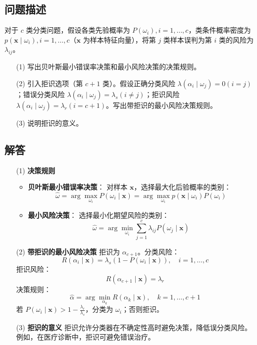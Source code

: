 \documentclass[UTF8]{report}
\theoremstyle{MyLineTheoremStyle} %
\theoremstyle{MyBlockTheoremStyle} %
\theoremstyle{MySubsubsectionStyle} %
\begin{document}
\subsection{问题描述}
对于 \( c \) 类分类问题，假设各类先验概率为 \( P(\omega_i), i=1,\ldots,c \)，类条件概率密度为 \( p(\mathbf{x} \mid \omega_i), i=1,\ldots,c \)（\(\mathbf{x}\) 为样本特征向量），将第 \( j \) 类样本误判为第 \( i \) 类的风险为 \( \lambda_{ij} \)。  
\begin{enumerate}
    \item[(1)] 写出贝叶斯最小错误率决策和最小风险决策的决策规则。
    \item[(2)] 引入拒识选项（第 \( c+1 \) 类）。假设正确分类风险 \( \lambda(\alpha_i \mid \omega_j) = 0 (i=j) \)；错误分类风险 \( \lambda(\alpha_i \mid \omega_j) = \lambda_s (i \neq j) \)；拒识风险 \( \lambda(\alpha_i \mid \omega_j) = \lambda_r (i = c+1) \)。写出带拒识的最小风险决策规则。
    \item[(3)] 说明拒识的意义。
\end{enumerate}

\subsection{解答}
\begin{itemize}
    \item[(1)] \textbf{决策规则}
    \begin{itemize}
        \item \textbf{贝叶斯最小错误率决策}：  
        对样本 \(\mathbf{x}\)，选择最大化后验概率的类别：  
        \[
        \hat{\omega} = \arg\max_{\omega_i} P(\omega_i \mid \mathbf{x}) = \arg\max_{\omega_i} p(\mathbf{x} \mid \omega_i) P(\omega_i)
        \]
        \item \textbf{最小风险决策}：  
        选择最小化期望风险的类别：  
        \[
        \hat{\omega} = \arg\min_{\omega_i} \sum_{j=1}^c \lambda_{ij} P(\omega_j \mid \mathbf{x})
        \]
    \end{itemize}
    \item[(2)] \textbf{带拒识的最小风险决策}  
    拒识为 \(\alpha_{c+1}\)。分类风险：  
    \[
    R(\alpha_i \mid \mathbf{x}) = \lambda_s (1 - P(\omega_i \mid \mathbf{x})), \quad i=1,\ldots,c
    \]  
    拒识风险：  
    \[
    R(\alpha_{c+1} \mid \mathbf{x}) = \lambda_r
    \]  
    决策规则：  
    \[
    \hat{\alpha} = \arg\min_{\alpha_k} R(\alpha_k \mid \mathbf{x}), \quad k = 1, \ldots, c+1
    \]  
    若 \( P(\omega_i \mid \mathbf{x}) > 1 - \frac{\lambda_r}{\lambda_s} \)，分类为 \(\omega_i\)；否则拒识。
    \item[(3)] \textbf{拒识的意义}  
    拒识允许分类器在不确定性高时避免决策，降低误分类风险。例如，在医疗诊断中，拒识可避免错误治疗。
\end{itemize}
\end{document}
